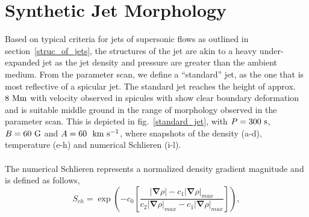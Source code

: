 \documentclass[12pt]{ociamthesis}
\newcommand{\kms}{~\rm{km ~s^{-1}}}
\newcommand{\np}{\\ \\}
\begin{document}
\section{Synthetic Jet Morphology}
Based on typical criteria for jets of supersonic flows as outlined in section~\ref{struc_of_jets}, the structures of the jet are akin to a heavy under-expanded jet \citep{Norman1982, Edgington-Mitchell2014} as the jet density and pressure are greater than the ambient medium. From the parameter scan, we define a ``standard'' jet, as the one that is most reflective of a spicular jet. The standard jet reaches the height of approx. $8~\rm{Mm}$ with velocity observed in spicules with show clear boundary deformation and is suitable middle ground in the range of morphology observed in the parameter scan.  This is depicted in fig.~\ref{standard_jet}, with $P=300~\rm{s}$, $B=60~\rm{G}$ and $A=60~\kms$, where snapshots of the density (a-d), temperature (e-h) and numerical Schlieren (i-l). \np
%
The numerical Schlieren represents a normalized density gradient magnitude and is defined as follows,
\begin{equation}
   S_{ch} = \exp{\left( -c_0 \left[ \frac{|\boldsymbol{\nabla} \rho|-c_1 |\boldsymbol{\nabla} \rho|_{max}}{c_2 |\boldsymbol{\nabla} \rho|_{max}-c_1|\boldsymbol{\nabla} \rho|_{max}} \right] \right)},
\end{equation}
\end{document}
